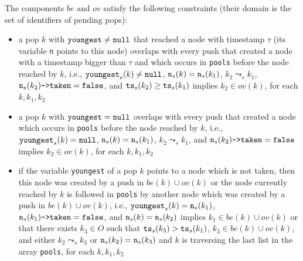 The components $be$ and $ov$ satisfy the following constraints (their domain is the set of identifiers of pending pops):
\vspace{-2mm}
\begin{itemize}
	\item a pop $k$ with ${\tt youngest}\neq {\tt null}$ that reached a node with timestamp $\tau$ (its variable {\tt n} points to this node) overlaps with every push that created a node with a timestamp bigger than $\tau$ and which occurs in {\tt pools} before the node reached by $k$, i.e., ${\tt youngest}_s(k)\neq{\tt null}$, ${\tt n}_s(k)={\tt n}_s(k_1)$, $k_2\leadsto_s k_1$, ${\tt n}_s(k_2)\text{\tt ->taken}={\tt false}$, and ${\tt ts}_s(k_2) \geq {\tt ts}_s(k_1)$ implies $k_2\in ov(k)$, for each $k, k_1, k_2$
	\item a pop $k$ with ${\tt youngest}={\tt null}$ overlaps with every push that created a node which occurs in {\tt pools} before the node reached by $k$,
i.e., ${\tt youngest}_s(k)={\tt null}$, ${\tt n}_s(k)={\tt n}_s(k_1)$, $k_2\leadsto_s k_1$, and ${\tt n}_s(k_2)\text{\tt ->taken}={\tt false}$ implies $k_2\in ov(k)$, for each $k, k_1, k_2$
	\item if the variable {\tt youngest} of a pop $k$ points to a node which is not taken, then this node was created by a push in $be(k)\cup ov(k)$ or the node currently reached by $k$ is followed in {\tt pools} by another node which was created by a push in $be(k)\cup ov(k)$, i.e., ${\tt youngest}_s(k)={\tt n}_s(k_1)$, ${\tt n}_s(k_1)\text{{\tt ->taken}}={\tt false}$, and ${\tt n}_s(k)={\tt n}_s(k_2)$ implies $k_1\in be(k)\cup ov(k)$ or that there exists $k_3\in O$ such that ${\tt ts}_s(k_3) > {\tt ts}_s(k_1)$, $k_3\in be(k)\cup ov(k)$, and either $k_2\leadsto_s k_3$ or ${\tt n}_s(k_2)={\tt n}_s(k_3)$ and $k$ is traversing the last list in the array {\tt pools}, for each $k, k_1,k_2$
%	
\vspace{-2mm}
\end{itemize}
